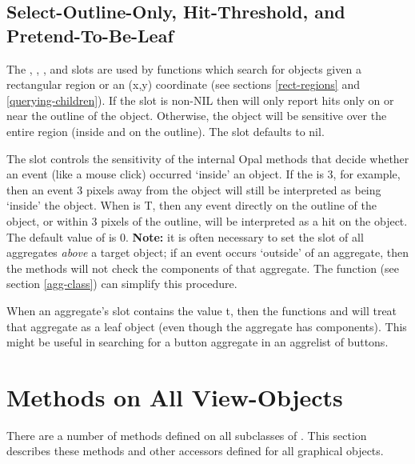\begin{group}
\section{Select-Outline-Only, Hit-Threshold, and Pretend-To-Be-Leaf}
The , , ,
and  slots are used by functions which search for objects
given a rectangular region or an (x,y) coordinate (see sections
\ref{rect-regions} and \ref{querying-children}).  If the
 slot is non-{\sc NIL} then  will
only report hits only on or near the outline of the object.
Otherwise, the object will be sensitive over the entire region (inside
and on the outline).  The  slot defaults to {\sc nil}.
\end{group}
\vspace{1 line}

The  slot controls the sensitivity of the internal Opal
 methods that decide whether an event (like a mouse click)
occurred `inside' an object.  If the  is 3, for example,
then an event 3 pixels away from the object will still be interpreted as being
`inside' the object.  When  is T, then any event
directly on the outline of the object, or within 3 pixels of the outline,
will be interpreted as a hit on the object.  The default value of
 is 0.  {\bf Note:} it is often necessary to set the
 slot of all aggregates {\it above} a target object;
if an event occurs `outside' of an aggregate, then the 
methods will not check the components of that aggregate.  The function
 (see section \ref{agg-class})
can simplify this procedure.

When an aggregate's  slot contains the value
{\sc t}, then the functions  and
 will treat that aggregate as a leaf
object (even though the aggregate has components).  This might be
useful in searching for a button aggregate in an aggrelist of buttons.



\chapter{Methods on All View-Objects}
\label{GobMethods}
There are a number of methods defined on all subclasses of
.  This section describes these methods and other
accessors defined for all graphical objects.

